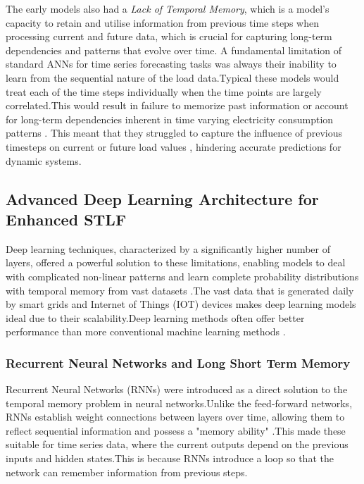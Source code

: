  The early models also had a \textit{Lack of Temporal Memory}, which is a model's capacity to retain and utilise information from previous time steps when processing current and future data, which is crucial for capturing long-term dependencies and patterns that evolve over time\cite{zhu2025novel}. A fundamental limitation of standard ANNs for time series forecasting tasks was always their inability to learn from the sequential nature of the load data.Typical these models would treat each of the time steps individually when the time points are largely correlated.This would result in failure to memorize past information or account for long-term dependencies inherent in time varying electricity consumption patterns \cite{wang2023short}. This meant that they struggled to capture the influence of previous timesteps on current or future load values , hindering accurate predictions for dynamic systems.
 
 \subsection{Advanced Deep Learning Architecture for Enhanced STLF}
 
 Deep learning techniques, characterized by a significantly higher number of layers, offered a powerful solution to these limitations, enabling models to deal with complicated non-linear patterns and learn complete probability distributions with temporal memory from vast datasets \cite{tshipata2024multi}.The vast data that is generated daily by smart grids and Internet of Things (IOT) devices makes deep learning models ideal due to their scalability.Deep learning methods often offer better performance than more conventional machine learning methods \cite{ibrahim2022machine}.
 
 \subsubsection{Recurrent Neural Networks and Long Short Term Memory}
 
 Recurrent Neural Networks (RNNs) were introduced as a direct solution to the temporal memory problem in neural networks.Unlike the feed-forward networks, RNNs establish weight connections between layers over time, allowing them to reflect sequential information and possess a "memory ability" \cite{wang2018short}.This made these suitable for time series data, where the current outputs depend on the previous inputs and hidden states.This is because RNNs introduce a loop so that the network can remember information from previous steps.
 
